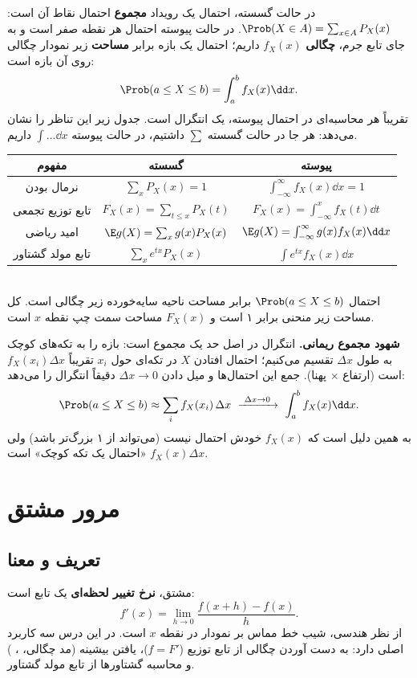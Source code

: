 در حالت گسسته، احتمال یک رویداد \textbf{مجموع} احتمال نقاط آن است: $\Prob(X\in A)=\sum_{x\in A}P_X(x)$. در حالت پیوسته احتمال هر نقطه صفر است و به جای تابع جرم، \textbf{چگالی} $f_X(x)$ داریم؛ احتمال یک بازه برابر \textbf{مساحت} زیر نمودار چگالی روی آن بازه است:
\[
\Prob(a\le X\le b)=\int_a^bf_X(x)\dd x .
\]
تقریباً هر محاسبه‌ای در احتمال پیوسته، یک انتگرال است. جدول زیر این تناظر را نشان می‌دهد: هر جا در حالت گسسته $\sum$ داشتیم، در حالت پیوسته $\int\ldots\dd x$ داریم.

\begin{center}
\renewcommand{\arraystretch}{1.5}
\begin{tabular}{c|c|c}
مفهوم & گسسته & پیوسته\\\hline
نرمال بودن & $\sum_xP_X(x)=1$ & $\int_{-\infty}^{\infty}f_X(x)\dd x=1$\\
تابع توزیع تجمعی & $F_X(x)=\sum_{t\le x}P_X(t)$ & $F_X(x)=\int_{-\infty}^xf_X(t)\dd t$\\
امید ریاضی & $\E g(X)=\sum_xg(x)P_X(x)$ & $\E g(X)=\int_{-\infty}^{\infty}g(x)f_X(x)\dd x$\\
تابع مولد گشتاور & $\sum_xe^{tx}P_X(x)$ & $\int e^{tx}f_X(x)\dd x$
\end{tabular}
\end{center}

\begin{center}
\begin{tikzpicture}
\end{tikzpicture}\\
{\small احتمال $\Prob(a\le X\le b)$ برابر مساحت ناحیه سایه‌خورده زیر چگالی است. کل مساحت زیر منحنی برابر ۱ است و $F_X(x)$ مساحت سمت چپ نقطه $x$ است.}
\end{center}

\textbf{شهود مجموع ریمانی.} انتگرال در اصل حد یک مجموع است: بازه را به تکه‌های کوچک به طول $\Delta x$ تقسیم می‌کنیم؛ احتمال افتادن $X$ در تکه‌ای حول $x_i$ تقریباً $f_X(x_i)\Delta x$ است (ارتفاع × پهنا). جمع این احتمال‌ها و میل دادن $\Delta x\to0$ دقیقاً انتگرال را می‌دهد:
\[
\Prob(a\le X\le b)\approx\sum_if_X(x_i)\,\Delta x\ \xrightarrow{\ \Delta x\to0\ }\ \int_a^bf_X(x)\dd x .
\]
به همین دلیل است که $f_X(x)$ خودش احتمال نیست (می‌تواند از ۱ بزرگ‌تر باشد) ولی $f_X(x)\Delta x$ «احتمال یک تکه کوچک» است.

\section{مرور مشتق}

\subsection{تعریف و معنا}
مشتق، \textbf{نرخ تغییر لحظه‌ای} یک تابع است:
\[
f'(x)=\lim_{h\to0}\frac{f(x+h)-f(x)}{h}.
\]
از نظر هندسی، شیب خط مماس بر نمودار در نقطه $x$ است. در این درس سه کاربرد اصلی دارد: به دست آوردن چگالی از تابع توزیع ($f=F'$)، یافتن بیشینه (مد چگالی، ، ) و محاسبه گشتاورها از تابع مولد گشتاور.


